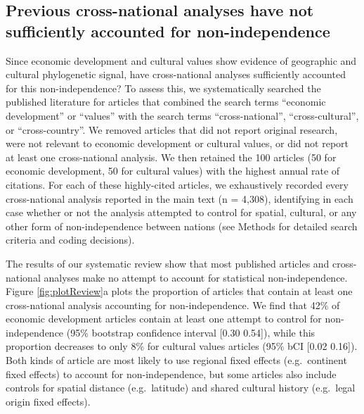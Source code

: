 \documentclass[
  english,
  man,floatsintext]{apa6}
\begin{document}
\hypertarget{previous-cross-national-analyses-have-not-sufficiently-accounted-for-non-independence}{%
\subsection{Previous cross-national analyses have not sufficiently accounted for non-independence}\label{previous-cross-national-analyses-have-not-sufficiently-accounted-for-non-independence}}

Since economic development and cultural values show evidence of geographic and cultural phylogenetic signal, have cross-national analyses sufficiently accounted for this non-independence? To assess this, we systematically searched the published literature for articles that combined the search terms \enquote{economic development} or \enquote{values} with the search terms \enquote{cross-national}, \enquote{cross-cultural}, or \enquote{cross-country}. We removed articles that did not report original research, were not relevant to economic development or cultural values, or did not report at least one cross-national analysis. We then retained the 100 articles (50 for economic development, 50 for cultural values) with the highest annual rate of citations. For each of these highly-cited articles, we exhaustively recorded every cross-national analysis reported in the main text (n = 4,308), identifying in each case whether or not the analysis attempted to control for spatial, cultural, or any other form of non-independence between nations (see Methods for detailed search criteria and coding decisions).

The results of our systematic review show that most published articles and cross-national analyses make no attempt to account for statistical non-independence. Figure \ref{fig:plotReview}a plots the proportion of articles that contain at least one cross-national analysis accounting for non-independence. We find that 42\% of economic development articles contain at least one attempt to control for non-independence (95\% bootstrap confidence interval {[}0.30 0.54{]}), while this proportion decreases to only 8\% for cultural values articles (95\% bCI {[}0.02 0.16{]}). Both kinds of article are most likely to use regional fixed effects (e.g.~continent fixed effects) to account for non-independence, but some articles also include controls for spatial distance (e.g.~latitude) and shared cultural history (e.g.~legal origin fixed effects).
\end{document}
